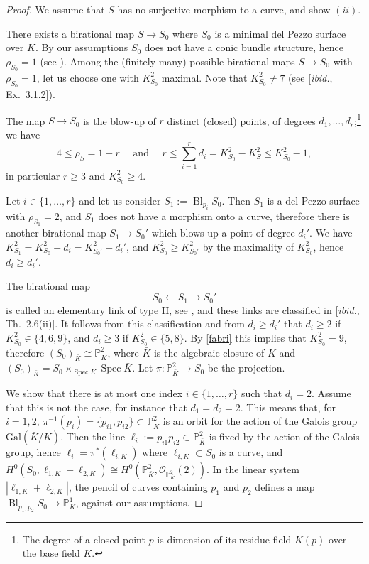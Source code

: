 \documentclass[a4paper,12pt]{amsart}
\theoremstyle{definition}
\numberwithin{figure}{section}
\numberwithin{table}{section}
\newcommand{\la}{\longrightarrow}
\newcommand{\ol}{\mathcal{O}}
\newcommand{\pr}{\mathbb{P}}
\newcommand{\Spec}{\operatorname{Spec}}
\newcommand{\Bl}{\operatorname{Bl}}
\begin{document}
      \begin{proof}
        We assume that $S$ has no surjective morphism to a curve, and show $(ii)$.
        
        There exists a birational map $S\to S_0$ where $S_0$ is a minimal del Pezzo surface over $K$. By our assumptions $S_0$ does not have a conic bundle structure, hence $\rho_{S_0}=1$ (see  \cite[Th.~3.9]{hassett}). Among the (finitely many) possible  birational maps $S\to S_0$ with $\rho_{S_0}=1$, let us choose one with $K_{S_0}^2$ maximal.  Note that $K_{S_0}^2\neq 7$ (see [\emph{ibid.}, Ex.~3.1.2]).

        The map $S\to S_0$ is the blow-up of $r$ distinct (closed) points, of degrees $d_1,\dotsc,d_r$;\footnote{The degree of a closed point $p$ is dimension of its residue field $K(p)$ over the base field $K$.} we have
        \begin{equation}\label{fabri}
        4\leq \rho_S=1+r\quad\text{ and }\quad 
      r\leq \sum_{i=1}^rd_i  =K_{S_0}^2-K_S^2\leq K_{S_0}^2-1,\end{equation}
in particular $r\geq 3$ and $K_{S_0}^2\geq 4$.
        
        Let $i\in\{1,\dotsc,r\}$ and      let us consider $S_1:=\Bl_{p_i}S_0$. Then $S_1$ is a del Pezzo surface with $\rho_{S_1}=2$, and $S_1$ does not have a morphism onto a curve, therefore  there is another birational map $S_1\to S_0'$ which blows-up  a point of degree $d_i'$. We have $K_{S_1}^2=K_{S_0}^2-d_i=K_{S_0'}^2-d_i'$, and $K_{S_0}^2\geq K_{S_0'}^2$
    by the maximality of $K_{S_0}^2$, hence $d_i\geq d_i'$.

  The birational map $$S_0\longleftarrow S_1\la S_0'$$ is called an elementary link of type II, see \cite[(2.2.2)]{isk96}, and these links are classified in [\emph{ibid.}, Th.~2.6(ii)].
       It follows from this classification and from $d_i\geq d_i'$
       that $d_i\geq 2$ if      $K_{S_0}^2\in\{4,6,9\}$, and   $d_i\geq 3$ if      $K_{S_0}^2\in\{5,8\}$.  By \eqref{fabri} this implies that  $K_{S_0}^2=9$, therefore  $(S_0)_{\bar K}\cong\pr^2_{\bar K}$, where $\bar K$ is the algebraic closure of $K$ and $(S_0)_{\bar K}=S_0\times_{\Spec K}\Spec {\bar K}$. Let $\pi\colon\pr^2_{\bar K}\to S_0$ be the projection. 

       We show that there is at most one index $i\in\{1,\dotsc,r\}$ such that $d_i=2$.       
       Assume that this is not the case, for instance that $d_1=d_2=2$. This means that, for $i=1,2$,
       $\pi^{-1}(p_i)=\{p_{i1},p_{i2}\}\subset \pr^2_{\bar K}$ is an orbit for the action of the Galois group $\text{Gal}(\bar K/K)$. Then the line $\ell_i:=\overline{p_{i1}p_{i2}}\subset \pr^2_{\bar K}$ is fixed by the action of the Galois group, hence $\ell_i=\pi^*(\ell_{i,K})$ where $\ell_{i,K}\subset S_0$ is a curve, and $H^0(S_0,\ell_{1,K}+\ell_{2,K})\cong H^0(\pr^2_{\bar K},\ol_{\pr^2_{\bar K}}(2))$. 
   In the linear system $|\ell_{1,K}+\ell_{2,K}|$, the pencil of curves     
     containing $p_1$ and $p_2$ defines a map $\Bl_{p_1,p_2}S_0\to\pr^1_K$, against our assumptions.


\end{proof}
\end{document}
